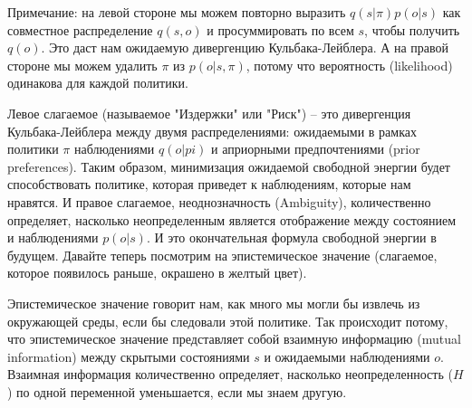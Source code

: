 \documentclass[12pt]{article}
\begin{document}
Примечание: на левой стороне мы можем повторно выразить $q(s|\pi) p(o|s)$ как совместное распределение $q(s,o)$ и просуммировать по всем $s$, чтобы получить $q(o)$. Это даст нам ожидаемую дивергенцию Кульбака-Лейблера. А на правой стороне мы можем удалить $\pi$ из $p(o|s,\pi)$, потому что вероятность (likelihood) одинакова для каждой политики.


Левое слагаемое (называемое "Издержки" или "Риск") -- это дивергенция Кульбака-Лейблера между двумя распределениями: ожидаемыми в рамках политики $\pi$ наблюдениями $q(o|pi)$ и априорными предпочтениями (prior preferences). Таким образом, минимизация ожидаемой свободной энергии будет способствовать политике, которая приведет к наблюдениям, которые нам нравятся. И правое слагаемое, неоднозначность (Ambiguity), количественно определяет, насколько неопределенным является отображение между состоянием и наблюдениями $p(o|s)$. И это окончательная формула свободной энергии в будущем. Давайте теперь посмотрим на эпистемическое значение (слагаемое, которое появилось раньше, окрашено в желтый цвет).


Эпистемическое значение говорит нам, как много мы могли бы извлечь из окружающей среды, если бы следовали этой политике. Так происходит потому, что эпистемическое значение представляет собой взаимную информацию (mutual information) между скрытыми состояниями $s$ и ожидаемыми наблюдениями $o$. Взаимная информация количественно определяет, насколько неопределенность ($H$) по одной переменной уменьшается, если мы знаем другую.

\end{document}
